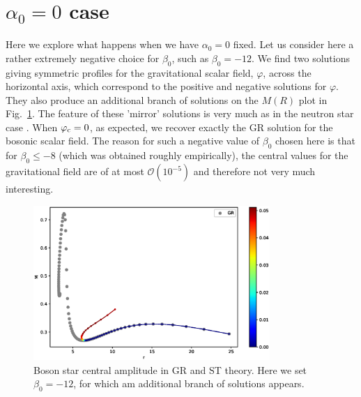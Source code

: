 \documentclass[12pt]{article}
\numberwithin{equation}{section}
\begin{document}
\section{$\alpha_0 = 0$ case}
Here we explore what happens when we have $\alpha_0 = 0$ fixed. Let us consider here a rather extremely negative choice for $\beta_0$, such as $\beta_0 = -12$. We find two solutions giving symmetric profiles for the gravitational scalar field, $\varphi$, across the horizontal axis, which correspond to the positive and negative solutions for $\varphi$. They also produce an additional branch of solutions on the $M(R)$ plot in Fig.~\ref{fig:alpha00}. The feature of these 'mirror' solutions is very much as in the neutron star case \cite{Rosca-Mead:2020bzt}. When $\varphi_{\rm c} = 0$, as expected, we recover exactly the GR solution for the bosonic scalar field. The reason for such a negative value of $\beta_0$ chosen here is that for $\beta_0 \leq -8$ (which was obtained roughly empirically), the central values for the gravitational field are of at most $\mathcal{O}(10^{-5})$ and therefore not very much interesting.

\begin{figure}
    \centering
    \includegraphics[width=0.8\textwidth, clip=True]{massles_beta12_alpha0.eps}
    \caption{Boson star central amplitude in GR and ST theory. Here we set $\beta_0 = -12$, for which am additional branch of solutions appears.}
    \label{fig:alpha00}
\end{figure}
\end{document}
